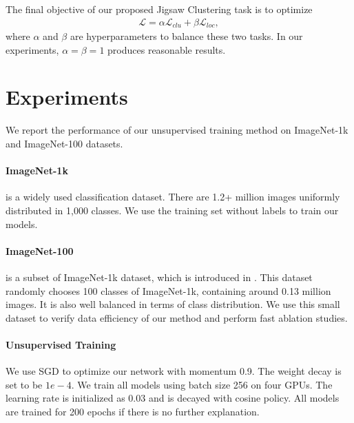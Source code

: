 \documentclass[final]{cvpr}
\begin{document}
The final objective of our proposed Jigsaw Clustering task is to optimize
\begin{align}
\mathcal{L} = \alpha \mathcal{L}_{clu} + \beta \mathcal{L}_{loc},
\end{align}
where $\alpha$ and $\beta$ are hyperparameters to balance these two tasks. In our experiments, $\alpha=\beta=1$ produces reasonable results.


\section{Experiments}
\label{sec:exp}

We report the performance of our unsupervised training method on ImageNet-1k \cite{imagenet} and ImageNet-100 datasets.

\paragraph{ImageNet-1k} is a widely used classification dataset. There are 1.2+ million images uniformly distributed in 1,000 classes. We use the training set without labels to train our models. 

\paragraph{ImageNet-100} is a subset of ImageNet-1k dataset, which is introduced in \cite{cmc}. This dataset randomly chooses 100 classes of ImageNet-1k, containing around 0.13 million images. It is also well balanced in terms of class distribution. We use this small dataset to verify data efficiency of our method and perform fast ablation studies.

\paragraph{Unsupervised Training} We use SGD to optimize our network with momentum 0.9. The weight decay is set to be $1e-4$. We train all models using batch size 256 on four GPUs. The learning rate is initialized as 0.03 and is decayed with cosine policy. All models are trained for 200 epochs if there is no further explanation.
\end{document}
